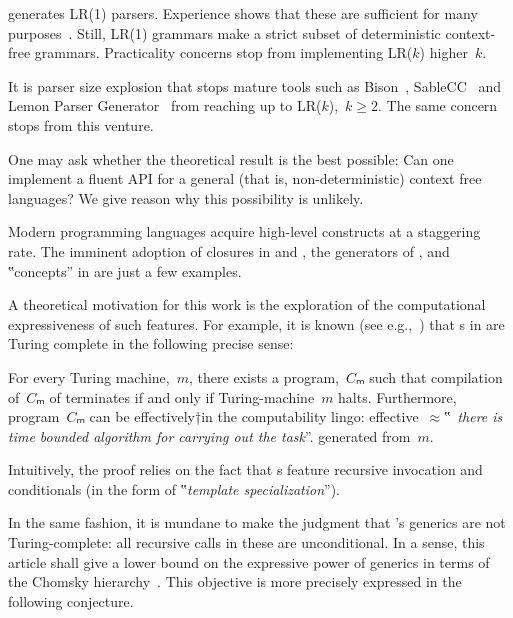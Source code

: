 \Self generates LR(1) parsers. Experience shows that these are
  sufficient for many purposes~\cite{find some references, perhaps the bison manual, but I am sure there are better references}.
Still, LR(1) grammars make a strict subset of deterministic context-free grammars.
Practicality concerns stop \Self from implementing LR($k$) higher~$k$. 

It is parser size explosion that stops mature tools such as Bison~\cite{Bison},
  SableCC~\cite{Sable:Search in databased, it should be there} and Lemon Parser Generator~\cite{something}
  from reaching up to LR($k$),~$k≥2$.
The same concern stops \Self from this venture.

One may ask whether the theoretical result is the
  best possible:
Can one implement a fluent API for a general
  (that is, non-deterministic) context free languages?
We give reason why this possibility is unlikely. 

Modern programming languages acquire high-level constructs
  at a staggering rate.
The imminent adoption of closures in \Java and \CC,
  the generators of \CSharp, and ‟concepts” in
  \CC are just a few examples.

A theoretical motivation for this work
  is the exploration of the computational
  expressiveness of such features.
For example, it is known (see e.g.,~\cite{Gutterman:2003}) that
  s in \CC are Turing complete in the following precise sense:

\begin{Theorem}
  \label{Theorem:Gutterman}
  For every Turing machine,~$m$, there exists a \CC program,~$Cₘ$ such that
    compilation of~$Cₘ$ of terminates if and only if
      Turing-machine~$m$ halts.
  Furthermore, program~$Cₘ$ can be effectively†{in the computability lingo:
    effective~$≈$‟~\emph{there is time
  bounded algorithm for carrying out the task}”.} generated from~$m$.
\end{Theorem}

Intuitively, the proof relies on the fact that s
  feature recursive invocation and conditionals (in the form of
  ‟\emph{template specialization}”).

In the same fashion, it is mundane to make the judgment that
  \Java's generics are not Turing-complete: all recursive calls
  in these are unconditional.
In a sense, this article shall give a lower bound on the
  expressive power of \Java generics in terms of the Chomsky hierarchy~\cite{Chomsky:1963}.
This objective is more precisely expressed in the following conjecture.

